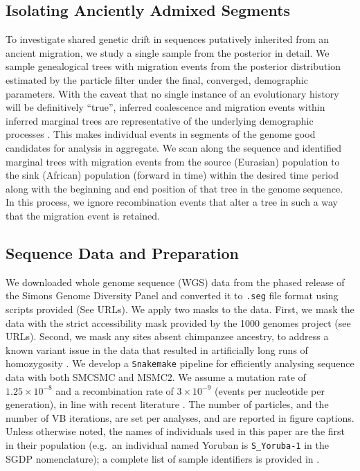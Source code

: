 \subsection{Isolating Anciently Admixed Segments} 


To investigate shared genetic drift in sequences putatively inherited from an ancient migration, we study a single sample from the posterior in detail. We sample genealogical trees with migration events from the posterior distribution estimated by the particle filter under the final, converged, demographic parameters.  With the caveat that no single instance of an evolutionary history will be definitively ``true'', inferred coalescence and migration events within inferred marginal trees are representative of the underlying demographic processes \cite{Hubisz2020}. This makes individual events in segments of the genome good candidates for analysis in aggregate. 
We scan along the sequence and identified marginal trees with migration events from the source (Eurasian) population to the sink (African) population (forward in time) within the desired time period along with the beginning and end position of that tree in the genome sequence. In this process, we ignore recombination events that alter a tree in such a way that the migration event is retained.  

\subsection{Sequence Data and Preparation}  We downloaded whole genome sequence (WGS) data from the phased release of the Simons Genome Diversity Panel and converted it to {\tt .seg} file format using scripts provided (See URLs). We apply two masks to the data. First, we mask the data with the strict accessibility mask provided by the 1000 genomes project (see URLs). Second, we mask any sites absent chimpanzee ancestry, to address a known variant issue in the data that resulted in artificially long runs of homozygosity \cite{Wang2019a}. We develop a {\tt Snakemake} \cite{Koster2012} pipeline for efficiently analysing sequence data with both SMCSMC and MSMC2. We assume a mutation rate of $1.25\times10^{-8}$ and a recombination rate of $3\times10^{-9}$ (events per nucleotide per generation), in line with recent literature \cite{Scally2012, Schiffels2014a}. The number of particles, and the number of VB iterations, are set per analyses, and are reported in figure captions. Unless otherwise noted, the names of individuals used in this paper are the first in their population (e.g.\ an individual named Yoruban is {\tt S\_Yoruba-1} in the SGDP nomenclature); a complete list of sample identifiers is provided in . 



